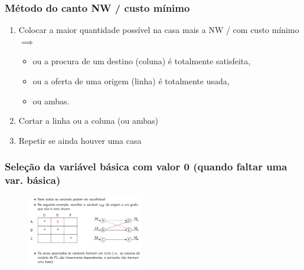 \documentclass[10pt, a4paper]{article}
\begin{document}
\begin{multicols}{2}
\subsubsection{Método do canto NW / custo mínimo}

\begin{enumerate}
    \item Colocar a maior quantidade possível na casa mais a NW / com custo mínimo\(\implies\)
    \begin{itemize}
        \item ou a procura de um destino (coluna) é totalmente satisfeita,
        \item ou a oferta de uma origem (linha) é totalmente usada,
        \item ou ambas.
    \end{itemize}
    \item Cortar a linha ou a coluna (ou ambas)
    \item Repetir se ainda houver uma casa
\end{enumerate}

\subsubsection{Seleção da variável básica com valor 0 (quando faltar uma var. básica)}

\begin{figure}[H]
    \centering
    \includegraphics[width=0.45\textwidth]{var_basica_0.png}
\end{figure}

%





\end{multicols}
\end{document}
